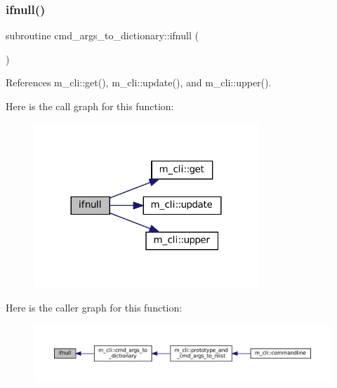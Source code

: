 \subsubsection{\texorpdfstring{ifnull()}{ifnull()}}
{\footnotesize\ttfamily subroutine cmd\+\_\+args\+\_\+to\+\_\+dictionary\+::ifnull (\begin{DoxyParamCaption}{ }\end{DoxyParamCaption})\hspace{0.3cm}{\ttfamily [private]}}



References m\+\_\+cli\+::get(), m\+\_\+cli\+::update(), and m\+\_\+cli\+::upper().

Here is the call graph for this function\+:
\nopagebreak
\begin{figure}[H]
\begin{center}
\leavevmode
\includegraphics[width=240pt]{M__CLI_8f90_aa26f90016621d1ee43d3b5b66316532b_cgraph}
\end{center}
\end{figure}
Here is the caller graph for this function\+:
\nopagebreak
\begin{figure}[H]
\begin{center}
\leavevmode
\includegraphics[width=350pt]{M__CLI_8f90_aa26f90016621d1ee43d3b5b66316532b_icgraph}
\end{center}
\end{figure}
